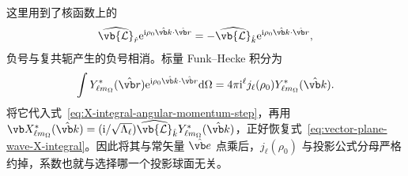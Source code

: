 这里用到了核函数上的
\begin{equation}
\widehat{\vb{\mathcal L}}_{\hat r}
\ee^{\ii\rho_0\hat{\vb k}\cdot\hat{\vb r}}
=-\widehat{\vb{\mathcal L}}_{\hat k}
\ee^{\ii\rho_0\hat{\vb k}\cdot\hat{\vb r}},
\end{equation}
负号与复共轭产生的负号相消。标量 Funk--Hecke 积分为
\begin{equation}
\int Y_{\ell m_\Omega}^*(\hat{\vb r})
\ee^{\ii\rho_0\hat{\vb k}\cdot\hat{\vb r}}\dd\Omega
=4\pi\ii^\ell j_\ell(\rho_0)Y_{\ell m_\Omega}^*(\hat{\vb k}).
\end{equation}
将它代入式~\cref{eq:X-integral-angular-momentum-step}，再用
$\vb X_{\ell m_\Omega}^*(\hat{\vb k})
=(\ii/\sqrt{\Lambda_\ell})
\widehat{\vb{\mathcal L}}_{\hat k}Y_{\ell m_\Omega}^*(\hat{\vb k})$，正好恢复式~\cref{eq:vector-plane-wave-X-integral}。因此将其与常矢量 $\hat{\vb e}$ 点乘后，$j_\ell(\rho_0)$ 与投影公式分母严格约掉，系数也就与选择哪一个投影球面无关。

